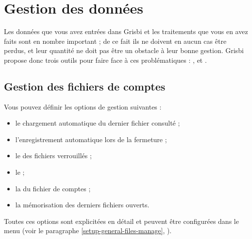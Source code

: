 
\chapter{Gestion des données\label{datamanagement}}


Les données que vous avez entrées dans Grisbi et les traitements que vous en avez faits sont en nombre important ; de ce fait ils ne doivent en aucun cas être perdus, et leur quantité ne doit pas être un obstacle à leur bonne gestion. Grisbi propose donc trois outils pour faire face à ces problématiques : ,  et .


\section{Gestion des fichiers de comptes\label{datamanagement-files}}


Vous pouvez définir les options de gestion suivantes :

\begin{itemize}
	\item le chargement automatique du dernier fichier consulté ;
	\item l'enregistrement automatique lors de la fermeture ;
	\item le  des fichiers verrouillés ;
	\item le  ;
	\item la  du fichier de comptes ;
	\item la mémorisation des derniers fichiers ouverts.
\end{itemize}

Toutes ces options sont explicitées en détail et peuvent être configurées dans le menu  (voir le paragraphe \vref{setup-general-files-manage}, ).


